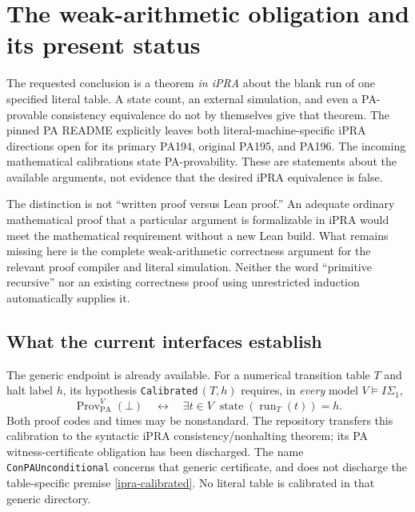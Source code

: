 \section{The weak-arithmetic obligation and its present status}
\label{ipra-status}

The requested conclusion is a theorem \emph{in iPRA} about the blank run
of one specified literal table.  A state count, an external simulation,
and even a PA-provable consistency equivalence do not by themselves give
that theorem.  The pinned PA README explicitly leaves both
literal-machine-specific iPRA directions open for its primary PA194,
original PA195, and PA196.  The incoming mathematical calibrations state
PA-provability.  These are statements about the available arguments, not
evidence that the desired iPRA equivalence is false.\cite{pa-readme}

The distinction is not ``written proof versus Lean proof.''  An adequate
ordinary mathematical proof that a particular argument is formalizable in
iPRA would meet the mathematical requirement without a new Lean build.
What remains missing here is the complete weak-arithmetic correctness
argument for the relevant proof compiler and literal simulation.  Neither
the word ``primitive recursive'' nor an existing correctness proof using
unrestricted induction automatically supplies it.

\subsection{What the current interfaces establish}
\label{ipra-interfaces}

The generic endpoint is already available.  For a numerical transition
table $T$ and halt label $h$, its hypothesis \texttt{Calibrated}$\,(T,h)$
requires, in \emph{every} model $V\models I\Sigma_1$,
\begin{equation}
 \operatorname{Prov}_{\mathrm{PA}}^V(\bot)
 \quad\longleftrightarrow\quad
 \exists t\in V\;\operatorname{state}(\operatorname{run}_T(t))=h.
 \label{ipra-calibrated}
\end{equation}
Both proof codes and times may be nonstandard.  The repository transfers
this calibration to the syntactic iPRA consistency/nonhalting theorem;
its PA witness-certificate obligation has been discharged.  The name
\texttt{ConPAUnconditional} concerns that generic certificate, and does
not discharge the table-specific premise \eqref{ipra-calibrated}.
No literal table is calibrated in that generic directory.\cite{ipra-generic}

